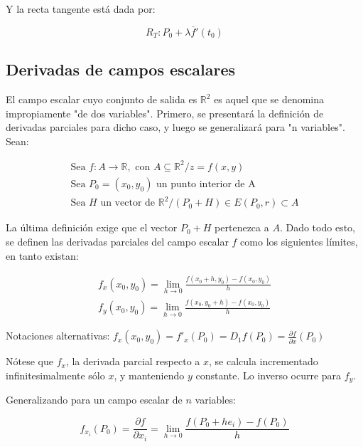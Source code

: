 \documentclass{article}
\renewcommand{\Bbb}{\mathbb}
\begin{document}
Y la recta tangente está dada por:

\begin{equation}
R_T: P_0 + \lambda \overline{f}'(t_0)
\end{equation}

\subsection{Derivadas de campos escalares}

El campo escalar cuyo conjunto de salida es $\Bbb R^2$ es aquel que se denomina impropiamente "de dos variables". Primero, se presentará la definición de derivadas parciales para dicho caso, y luego se generalizará para "n variables". Sean:

\begin{subequations}
\begin{align}
\text{Sea } f: A \rightarrow \Bbb R, \text{ con } A \subseteq \Bbb R^2 / z = f(x,y) \\
\text{Sea } P_0 = (x_0, y_0) \text{ un punto interior de A} \\
\text{Sea } H \text{ un vector de } \Bbb R^2 / (P_0 + H) \in E(P_0, r) \subset A
\end{align}
\end{subequations}

La última definición exige que el vector $P_0 + H$ pertenezca a $A$. Dado todo esto, se definen las derivadas parciales del campo escalar $f$ como los siguientes límites, en tanto existan:

\begin{subequations}
\begin{align}
f_x(x_0, y_0) = \lim_{h \rightarrow 0} \frac{f(x_0 + h, y_0) - f(x_0, y_0)}{h} \\
f_y(x_0, y_0) = \lim_{h \rightarrow 0} \frac{f(x_0, y_0 + h) - f(x_0, y_0)}{h}
\end{align}
\end{subequations}

Notaciones alternativas: $f_x(x_0, y_0) = f'_x(P_0) = D_1 f(P_0) = \frac{\partial f}{\partial x} (P_0)$

Nótese que $f_x$, la derivada parcial respecto a $x$, se calcula incrementado infinitesimalmente sólo $x$, y manteniendo $y$ constante. Lo inverso ocurre para $f_y$.

Generalizando para un campo escalar de $n$ variables:

\begin{equation}
f_{x_i}(P_0) = \frac{\partial f}{\partial x_i} = \lim_{h \rightarrow 0} \frac{f(P_0 + h e_i) - f(P_0)}{h}
\end{equation}
\end{document}
